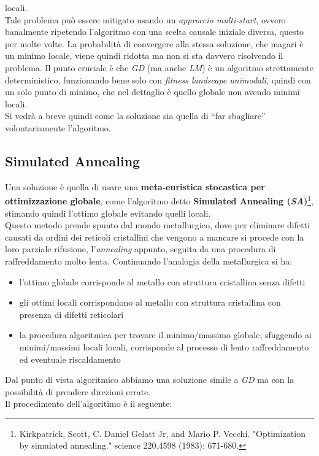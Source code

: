 \documentclass[a4paper,12pt, oneside]{book}
\begin{document}
locali.\\
Tale problema può essere mitigato usando un \textit{approccio multi-start},
ovvero banalmente ripetendo l'algoritmo con una scelta causale iniziale diversa,
questo per molte volte. La probabilità di convergere alla stessa soluzione, che
magari è un minimo locale, viene quindi ridotta ma non si sta davvero risolvendo
il problema. Il punto cruciale è che \textit{GD} (ma anche \textit{LM}) è un
algoritmo strettamente deterministico, funzionando bene solo con \textit{fitness
  landscape unimodali}, quindi con un solo punto di minimo, che nel dettaglio è
quello globale non avendo minimi locali. \\
Si vedrà a breve quindi come la soluzione sia quella di  ``far sbagliare''
volontariamente l'algoritmo.
\subsection{Simulated Annealing}
Una soluzione è quella di usare una \textbf{meta-euristica stocastica per
  ottimizzazione globale}, come l'algoritmo detto \textbf{Simulated Annealing
  (\textit{SA})}\footnote{Kirkpatrick, Scott, C. Daniel Gelatt Jr, and Mario
  P. Vecchi. "Optimization by simulated annealing." science 220.4598 (1983):
  671-680.}, stimando quindi l'ottimo globale evitando quelli locali.\\ 
Questo metodo prende spunto dal mondo metallurgico, dove per eliminare
difetti causati da ordini dei reticoli cristallini che vengono a mancare si
procede con la loro parziale rifusione, l’\textit{annealing} appunto, seguita da 
una procedura di raffreddamento molto lenta. Continuando l’analogia della
metallurgica si ha:
\begin{itemize}
  \item l’ottimo globale corrisponde al metallo con struttura cristallina
  senza difetti
  \item gli ottimi locali corrispondono al metallo con struttura cristallina
  con presenza di difetti reticolari
  \item la procedura algoritmica per trovare il minimo/massimo globale,
  sfuggendo 
  ai minimi/massimi locali locali, corrisponde al processo di lento
  raffreddamento 
  ed eventuale riscaldamento 
\end{itemize}
Dal punto di vista algoritmico abbiamo una soluzione simile a \textit{GD} ma con
la possibilità di prendere direzioni errate.\\
Il procedimento dell'algoritimo è il seguente:
\end{document}
